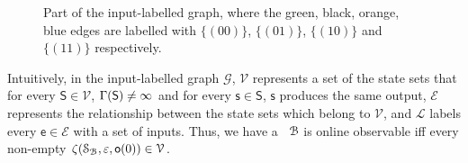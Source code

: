 \begin{figure}[thpb]
      \centering
      \caption{Part of the input-labelled graph, where the green, black, orange, blue edges are labelled with $\{(00)\}$, $\{(01)\}$, $\{(10)\}$ and $\{(11)\}$ respectively.}
      \label{fig:4}
\end{figure}
Intuitively, in the input-labelled graph $\mathcal{G}$, $\mathcal{V}$ represents a set of the state sets that for every $\mathsf{S}\in \mathcal{V}$, $\Gamma(\mathsf{S})\ne \infty$ and for every $\mathsf{s}\in\mathsf{S}$, $\mathsf{s}$ produces the same output, $\mathcal{E}$ represents the relationship between the state sets which belong to $\mathcal{V}$, and $\mathcal{L}$ labels every $\mathsf{e} \in\mathcal{E}$ with a set of inputs. %
Thus, we have a \BCN\ ${\mathcal{B}}$ is online observable iff every non-empty $\zeta(\mathcal{S}_{\mathcal{B}},\varepsilon, \mathsf{o}(0))\in \mathcal{V}$. %


